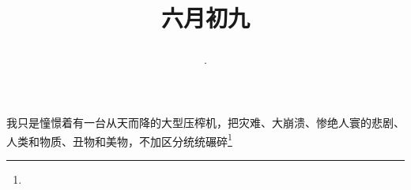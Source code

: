 \title{\date[d=14,m=7,y=2024][year:cn-y,年,month:cn,day:cn,日,·,weekday]·六月初九 }
我只是憧憬着有一台从天而降的大型压榨机，把灾难、大崩溃、惨绝人寰的悲剧、人类和物质、丑物和美物，不加区分统统碾碎\footnote{ }

